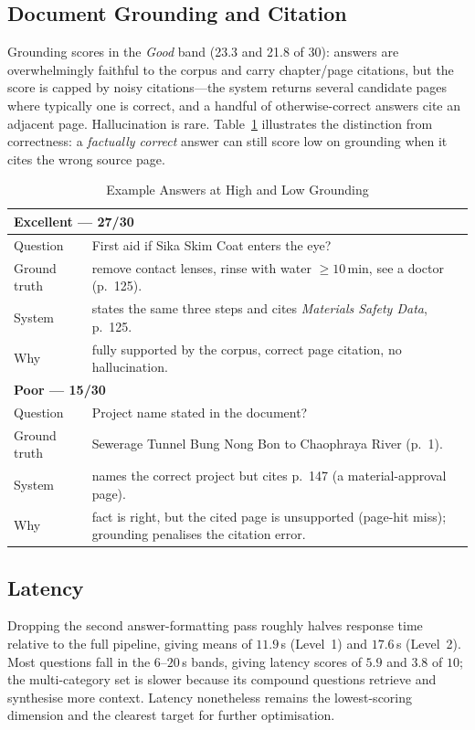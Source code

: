 \documentclass[10pt,a4paper,conference]{IEEEtran}
\begin{document}
\subsection{Document Grounding and Citation}
Grounding scores in the \emph{Good} band (23.3 and 21.8 of 30): answers
are overwhelmingly faithful to the corpus and carry chapter/page citations, but
the score is capped by noisy citations---the system returns several candidate
pages where typically one is correct, and a handful of otherwise-correct
answers cite an adjacent page. Hallucination is rare. Table~\ref{tab:exgrnd}
illustrates the distinction from correctness: a \emph{factually correct} answer
can still score low on grounding when it cites the wrong source page.

\begin{table}[htbp]
\caption{Example Answers at High and Low Grounding}
\begin{center}
\footnotesize
\begin{tabular}{|p{}|p{}|}
\hline
\multicolumn{2}{|l|}{\textbf{Excellent --- 27/30}} \\
\hline
Question & First aid if Sika Skim Coat enters the eye? \\
\hline
Ground truth & remove contact lenses, rinse with water $\ge 10$\,min, see a doctor (p.~125). \\
\hline
System & states the same three steps and cites \emph{Materials Safety Data}, p.~125. \\
\hline
Why & fully supported by the corpus, correct page citation, no hallucination. \\
\hline
\multicolumn{2}{|l|}{\textbf{Poor --- 15/30}} \\
\hline
Question & Project name stated in the document? \\
\hline
Ground truth & Sewerage Tunnel Bung Nong Bon to Chaophraya River (p.~1). \\
\hline
System & names the correct project but cites p.~147 (a material-approval page). \\
\hline
Why & fact is right, but the cited page is unsupported (page-hit miss); grounding penalises the citation error. \\
\hline
\end{tabular}
\label{tab:exgrnd}
\end{center}
\end{table}

\subsection{Latency}
Dropping the second answer-formatting pass roughly halves response time relative
to the full pipeline, giving means of $11.9$\,s (Level~1) and $17.6$\,s
(Level~2). Most questions fall in the $6$--$20$\,s bands, giving latency scores
of $5.9$ and $3.8$ of $10$; the multi-category set is slower because its compound
questions retrieve and synthesise more context. Latency nonetheless remains the
lowest-scoring dimension and the clearest target for further optimisation.
\end{document}

